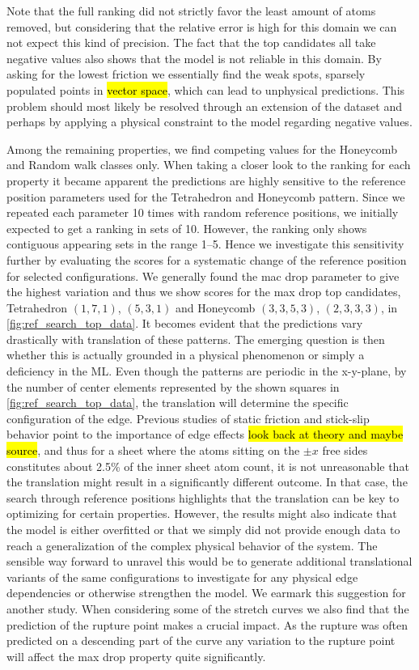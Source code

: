 Note that the full ranking did not strictly favor the least amount of
atoms removed, but considering that the relative error is high for this domain we can not expect this kind of precision. The fact that the top candidates all take
negative values also shows that the model is not reliable in this domain. By
asking for the lowest friction we essentially find the weak spots, sparsely populated points in \hl{vector space},  which can lead to unphysical predictions. This problem should most likely be resolved through an extension of the dataset and perhaps by applying a physical constraint to the
model regarding negative values. 

Among the remaining properties, we find competing values for the Honeycomb and Random walk classes only. When taking a closer look to the ranking for each property it became apparent the predictions are highly sensitive
to the reference position parameters used for the Tetrahedron and Honeycomb
pattern. Since we repeated each parameter 10 times with random reference positions, we initially expected to get a ranking in sets of 10. However, the ranking only shows contiguous appearing sets in the range 1--5. Hence we investigate this sensitivity further by evaluating the scores for a systematic change of the reference position for selected configurations. We generally found the mac drop parameter to give the highest variation and thus we show scores for the max drop top candidates, Tetrahedron $(1,7,1)$, $(5,3,1)$ and Honeycomb $(3,3,5,3)$, $(2,3,3,3)$, in
\cref{fig:ref_search_top_data}. It becomes evident that the predictions vary
drastically with translation of these patterns. The emerging question is then whether this is actually grounded in a physical phenomenon or simply a deficiency in the \acrshort{ML}. Even though the patterns are periodic in the x-y-plane, by the number of center elements represented by the shown squares in \cref{fig:ref_search_top_data}, the translation will determine the specific configuration of the edge. Previous studies of static friction and stick-slip behavior point to the importance of edge effects \hl{look back at theory and
maybe source}, and thus for a sheet where the atoms sitting on the $\pm x$ free sides constitutes about 2.5\% of the inner sheet atom count, it is not unreasonable
that the translation might result in a significantly different outcome. In that case, the search through reference positions highlights that the translation can be key to optimizing for certain properties. However, the results might also indicate that the model is either overfitted or that we simply did not provide enough data to reach a generalization of the complex physical behavior of the system. The sensible way forward to unravel this would be to generate additional
translational variants of the same configurations to investigate for any physical edge dependencies or otherwise strengthen the model. We earmark this suggestion for another study. When considering some of the stretch curves we also find that the prediction of the rupture point makes a crucial impact. As the rupture was often predicted on a descending part of the curve any variation to the rupture point will affect the max drop property quite significantly.





